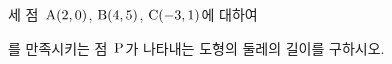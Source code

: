 세 점~$\mathrm{A}(2{,}\mkern3mu\mathopen{}0)$, $\mathrm{B}(4{,}\mkern3mu\mathopen{}5)$, $\mathrm{C}(-3{,}\mkern3mu\mathopen{}1)$에 대하여 \par\smallskip{}\par\smallskip\noindent 를 만족시키는 점~$\mathrm{P}$가 나타내는 도형의 둘레의 길이를 구하시오.
